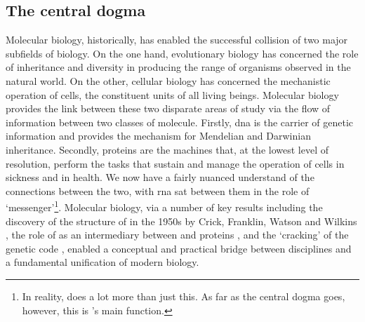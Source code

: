 \documentclass[thesis.tex]{subfiles}
\begin{document}
\subsection{The central dogma}
Molecular biology, historically, has enabled the successful collision of two major subfields of biology. On the one hand, evolutionary biology has concerned the role of inheritance and diversity in producing the range of organisms observed in the natural world. On the other, cellular biology has concerned the mechanistic operation of cells, the constituent units of all living beings. Molecular biology provides the link between these two disparate areas of study via the flow of information between two classes of molecule. Firstly, \gls{dna} is the carrier of genetic information and provides the mechanism for Mendelian and Darwinian inheritance. Secondly, proteins are the machines that, at the lowest level of resolution, perform the tasks that sustain and manage the operation of cells in sickness and in health. We now have a fairly nuanced understand of the connections between the two, with \gls{rna} sat between them in the role of `messenger'\footnote{In reality,  does a lot more than just this. As far as the central dogma goes, however, this is 's main function.}. Molecular biology, via a number of key results including the discovery of the structure of  in the 1950s by Crick, Franklin, Watson and Wilkins \citep{franklin_molecular_1953, watson_molecular_1953, wilkins_molecular_1953, maddox_double_2003}, the role of  as an intermediary between  and proteins \citep{boivin_sur_1947, crick_protein_1958, brenner_unstable_1961, cobb_who_2015}, and the `cracking' of the genetic code \citep{crick_general_1961, nirenberg_rna_1964, brenner_uga_1967, tamura_genetic_2016}, enabled a conceptual and practical bridge
between disciplines and a fundamental unification of modern biology. 
\end{document}
